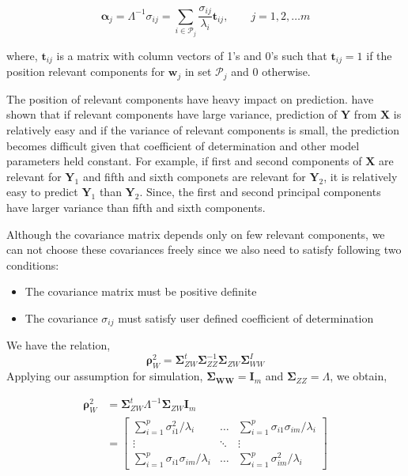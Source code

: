 \documentclass[12pt,A4paper,authoryear]{elsarticle} %
\providecommand{\tightlist}{%
  \setlength{\itemsep}{0pt}\setlength{\parskip}{0pt}}
\begin{document}
\[
\boldsymbol{\alpha}_j = \Lambda^{-1} \sigma_{ij} = \sum_{i \in \mathcal{P}_j}\frac{\sigma_{ij}}{\lambda_i}\mathbf{t}_{ij},\qquad j = 1, 2, \ldots m
\]

where, \(\mathbf{t}_{ij}\) is a matrix with column vectors of 1's and
0's such that \(\mathbf{t}_{ij} = 1\) if the position relevant
components for \(\mathbf{w}_j\) in set \(\mathcal{P}_j\) and 0
otherwise.

The position of relevant components have heavy impact on prediction.
\citet{helland1994comparison} have shown that if relevant components
have large variance, prediction of \(\mathbf{Y}\) from \(\mathbf{X}\) is
relatively easy and if the variance of relevant components is small, the
prediction becomes difficult given that coefficient of determination and
other model parameters held constant. For example, if first and second
components of \(\mathbf{X}\) are relevant for \(\mathbf{Y}_1\) and fifth
and sixth componets are relevant for \(\mathbf{Y}_2\), it is relatively
easy to predict \(\mathbf{Y}_1\) than \(\mathbf{Y}_2\). Since, the first
and second principal components have larger variance than fifth and
sixth components.

Although the covariance matrix depends only on few relevant components,
we can not choose these covariances freely since we also need to satisfy
following two conditions:

\begin{itemize}
\tightlist
\item
  The covariance matrix must be positive definite
\item
  The covariance \(\sigma_{ij}\) must satisfy user defined coefficient
  of determination
\end{itemize}

We have the relation,
\[\boldsymbol{\rho}_W^2 = \boldsymbol{\Sigma}_{ZW}^t\boldsymbol{\Sigma}_{ZZ}^{-1}\boldsymbol{\Sigma}_{ZW}\boldsymbol{\Sigma}_{WW}^I\]
Applying our assumption for simulation,
\(\boldsymbol{\Sigma_{WW}} = \mathbf{I}_m\) and
\(\boldsymbol{\Sigma}_{ZZ} = \Lambda\), we obtain,

\[
\begin{aligned}
\boldsymbol{\rho}_W^2 &= \boldsymbol{\Sigma}_{ZW}^t \Lambda^{-1} \boldsymbol{\Sigma}_{ZW} \mathbf{I}_m \\
&= \begin{bmatrix}
\sum_{i = 1}^p \sigma_{i1}^2/\lambda_i          & \ldots & \sum_{i = 1}^p \sigma_{i1}\sigma_{im}/\lambda_i \\
\vdots                                          & \ddots & \vdots \\
\sum_{i = 1}^p \sigma_{i1}\sigma_{im}/\lambda_i & \ldots & \sum_{i = 1}^p \sigma_{im}^2/\lambda_i
\end{bmatrix}
\end{aligned}
\]
\end{document}
